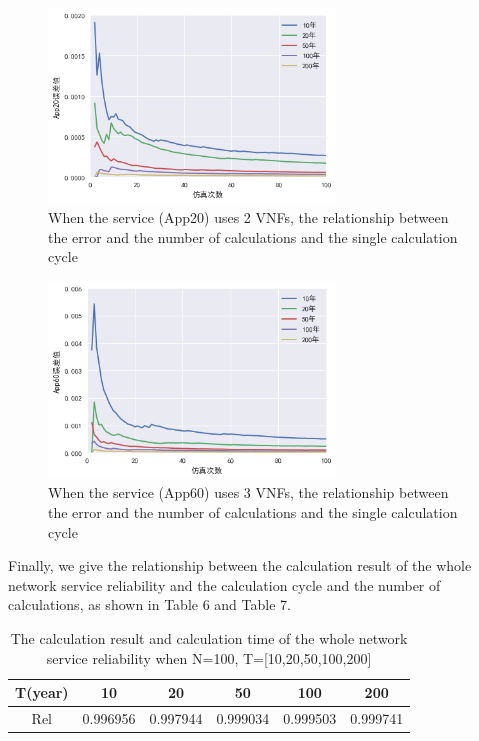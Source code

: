 \documentclass[journal]{IEEEtran}
\begin{document}
    \begin{figure}[!t]
        \begin{center}
            \includegraphics[width = 3in]{img/16.png}
            \caption{When the service (App20) uses 2 VNFs, the relationship between the error and the number of calculations and the single calculation cycle}
            \label{fig10}
        \end{center}
    \end{figure}

    \begin{figure}[!t]
        \begin{center}
            \includegraphics[width = 3in]{img/17.png}
            \caption{When the service (App60) uses 3 VNFs, the relationship between the error and the number of calculations and the single calculation cycle}
            \label{fig10}
        \end{center}
    \end{figure}

    Finally, we give the relationship between the calculation result of the whole network service reliability and the calculation cycle and the number of calculations, as shown in Table 6 and Table 7.

    \begin{table}[!t]
        \renewcommand{\arraystretch}{1.3}
        \caption{The calculation result and calculation time of the whole network service reliability when N=100, T=[10,20,50,100,200]}
        \label{tab11}
        \centering
        \begin{tabular}{|c|c|c|c|c|c|}
            \hline
            T(year) & 10       & 20       & 50       & 100      & 200      \\
            \hline
            Rel     & 0.996956 & 0.997944 & 0.999034 & 0.999503 & 0.999741 \\
            \hline
        \end{tabular}
    \end{table}
\end{document}
